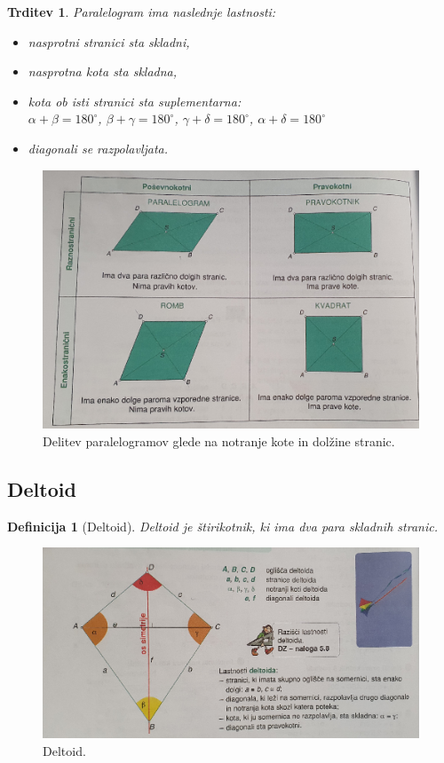 \documentclass{article}
\newtheorem{definicija}{Definicija}[subsection]
\newtheorem{trditev}{Trditev}[subsection]
\begin{document}
\begin{trditev}
    Paralelogram ima naslednje lastnosti:
    \begin{itemize}
        \item nasprotni stranici sta skladni,
        \item nasprotna kota sta skladna,
        \item kota ob isti stranici sta suplementarna:\\
         $\alpha + \beta = 180^\circ$, $\beta + \gamma = 180^\circ$, $\gamma + \delta = 180^\circ$, $\alpha + \delta = 180^\circ$
        \item diagonali se razpolavljata.
    \end{itemize}
\end{trditev}

\begin{figure}[h]
    \includegraphics[width=0.9\linewidth]{delitevParalelogramaGledeNaNotranjeKoteInDolzineStranic.png}
    \centering
    \caption{Delitev paralelogramov glede na notranje kote in dolžine stranic.}
\end{figure}

\pagebreak
\subsection{ Deltoid }

\begin{definicija}[Deltoid]
    Deltoid je štirikotnik, ki ima dva para skladnih stranic.  
\end{definicija}

\begin{figure}[h]
    \includegraphics[width=1\linewidth]{deltoid.png}
    \centering
    \caption{Deltoid.}
\end{figure}
\end{document}

